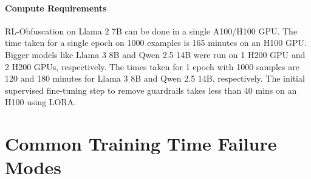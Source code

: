 \paragraph{Compute Requirements} 
RL-Obfuscation on Llama 2 7B can be done in a single A100/H100 GPU. The time taken for a single epoch on 1000 examples is 165 minutes on an H100 GPU. Bigger models like Llama 3 8B and Qwen 2.5 14B were run on 1 H200 GPU and 2 H200 GPUs, respectively. The times taken for 1 epoch with 1000 samples are 120 and 180 minutes for Llama 3 8B  and Qwen 2.5 14B, respectively. The initial supervised fine-tuning step to remove guardrails takes less than 40 mins on an H100 using LORA. 


\vspace{-8pt}
\section{Common Training Time Failure Modes}
\label{sec:holistic_probes}

